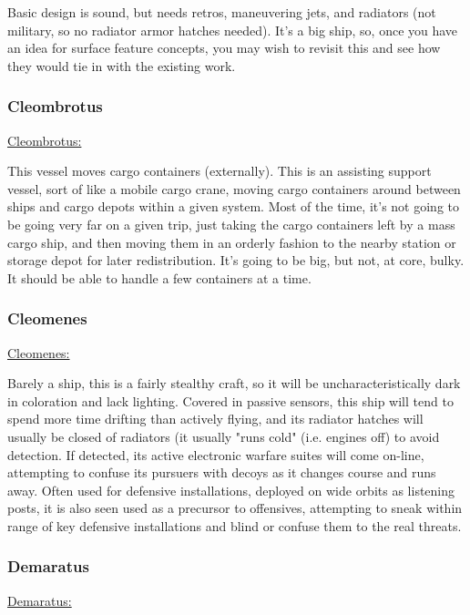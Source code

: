 Basic design is sound, but needs retros, maneuvering jets, and
radiators (not military, so no radiator armor hatches needed). It's a
big ship, so, once you have an idea for surface feature concepts, you
may wish to revisit this and see how they would tie in with the
existing work.


\subsubsection{Cleombrotus}
\href{http://vegastrike.sourceforge.net/wiki/Vessel:Cleombrotus}{Cleombrotus:}

This vessel moves cargo containers (externally). This is an assisting
support vessel, sort of like a mobile cargo crane, moving cargo
containers around between ships and cargo depots within a given
system. Most of the time, it's not going to be going very far on a
given trip, just taking the cargo containers left by a mass cargo
ship, and then moving them in an orderly fashion to the nearby station
or storage depot for later redistribution. It's going to be big, but
not, at core, bulky. It should be able to handle a few containers at a
time.



\subsubsection{Cleomenes}
\href{http://vegastrike.sourceforge.net/wiki/Vessel:Cleomenes}{Cleomenes:}

Barely a ship, this is a fairly stealthy craft, so it will be
uncharacteristically dark in coloration and lack lighting. Covered in
passive sensors, this ship will tend to spend more time drifting than
actively flying, and its radiator hatches will usually be closed of
radiators (it usually "runs cold" (i.e. engines off) to avoid
detection. If detected, its active electronic warfare suites will come
on-line, attempting to confuse its pursuers with decoys as it changes
course and runs away. Often used for defensive installations, deployed
on wide orbits as listening posts, it is also seen used as a precursor
to offensives, attempting to sneak within range of key defensive
installations and blind or confuse them to the real threats.

\subsubsection{Demaratus}
\href{http://vegastrike.sourceforge.net/wiki/Vessel:Demaratus}{Demaratus:}

